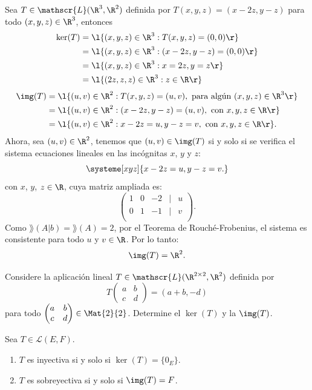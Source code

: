 \documentclass[compacto,10pt]{pubciencias-notas}
\begin{document}
\begin{ejem}\hspace{0pt}\label{AplicacionLineal}
Sea $T\in \mathscr{L}(\R^3,\R^2)$ definida por $T(x,y,z) = (x-2z,y-z)$ para todo $(x,y,z)\in\R^{3}$, entonces
\begin{align*}
 \ker(T) &= \l\{(x,y,z)\in \R^3:T(x,y,z)=(0,0)\r\}\\
 &= \l\{(x,y,z)\in \R^3:(x-2z,y-z)=(0,0)\r\}\\
 &=\l\{(x,y,z)\in \R^3:x=2z, y=z\r\}\\
 &=\l\{(2z,z,z)\in \R^3:z\in\R\r\}
\end{align*}
\texty
\begin{align*}
    \img(T) &= \l\{(u,v)\in \R^2: T(x,y,z)=(u,v), \text{ para algún } (x,y,z)\in\R^{3}\r\}\\
    &= \l\{(u,v)\in \R^2: (x-2z,y-z)=(u,v), \text{ con }x,y,z\in\R\r\}\\
    &= \l\{(u,v)\in \R^2: x-2z=u, y-z=v, \text{ con }x,y,z\in\R\r\}.
\end{align*}
Ahora, sea $(u,v)\in\R^{2}$, tenemos que $(u,v)\in\img(T)$ si y solo si se verifica el sistema ecuaciones lineales en las incógnitas $x$, $y$ y $z$:
\[
\systeme[xyz]{x-2z=u,y-z=v.}
\]
con $x$, $y$, $z\in\R$, cuya matriz ampliada es:
\[
    \begin{pmatrix}
    1&0&-2&|&u\\
    0&1&-1&|&v\\
    \end{pmatrix}.
\]
Como $\rang(A|b)=\rang(A)=2$, por el Teorema de Rouch\'e-Frobenius, el sistema es consistente para todo $u$ y $v\in\R$. Por lo tanto:
\[
    \img(T)= \R^{2}.
\]
\end{ejem}

\begin{ejer}
Considere la aplicaci\'on lineal $T\in \mathscr{L}(\R^{2\times 2},\R^2)$ definida por 
\[
    T\begin{pmatrix}a&b\\c&d\end{pmatrix}=(a+b,-d)
\]
para todo $\begin{pmatrix}a&b\\c&d\end{pmatrix}\in\Mat{2}{2}$. Determine el $\ker(T)$  y la $\img(T)$.
\end{ejer}

\begin{prop}
Sea $T \in \mathscr{L}(E,F)$.
\begin{enumerate}
\item $T$ es inyectiva si y solo si $\ker(T)=\{0_{E}\}$.
\item $T$ es sobreyectiva si y solo si $\img(T)=F$.
\end{enumerate}
\end{prop}
\end{document}
